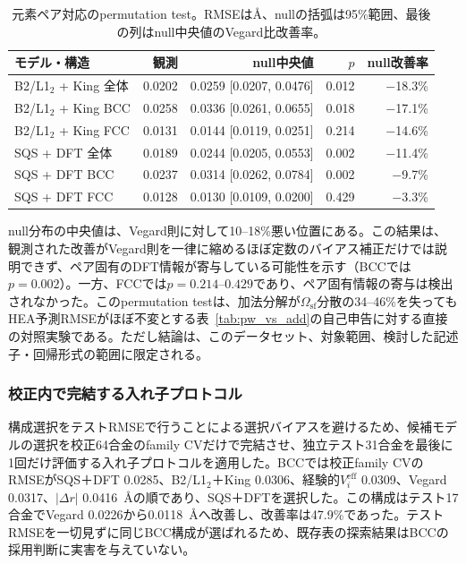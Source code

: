 \documentclass[5p,10pt]{elsarticle}
\begin{document}
\begin{table}[H]
\centering
\caption{元素ペア対応のpermutation test。RMSEは\AA、nullの括弧は95\%範囲、最後の列はnull中央値のVegard比改善率。}
\label{tab:permutation_test}
\scriptsize
\begin{tabular}{@{}lrrrr@{}}
\toprule
モデル・構造 & 観測 & null中央値 & $p$ & null改善率 \\
\midrule
B2/L1$_2$ + King 全体 & 0.0202 & 0.0259 [0.0207, 0.0476] & 0.012 & $-$18.3\% \\
B2/L1$_2$ + King BCC & 0.0258 & 0.0336 [0.0261, 0.0655] & 0.018 & $-$17.1\% \\
B2/L1$_2$ + King FCC & 0.0131 & 0.0144 [0.0119, 0.0251] & 0.214 & $-$14.6\% \\
SQS + DFT 全体 & 0.0189 & 0.0244 [0.0205, 0.0553] & 0.002 & $-$11.4\% \\
SQS + DFT BCC & 0.0237 & 0.0314 [0.0262, 0.0784] & 0.002 & $-$9.7\% \\
SQS + DFT FCC & 0.0128 & 0.0130 [0.0109, 0.0200] & 0.429 & $-$3.3\% \\
\bottomrule
\end{tabular}
\end{table}

null分布の中央値は、Vegard則に対して10--18\%悪い位置にある。この結果は、観測された改善がVegard則を一律に縮めるほぼ定数のバイアス補正だけでは説明できず、ペア固有のDFT情報が寄与している可能性を示す（BCCでは$p = 0.002$）。一方、FCCでは$p=0.214$--$0.429$であり、ペア固有情報の寄与は検出されなかった。このpermutation testは、加法分解が$\Omega_\text{sf}$分散の34--46\%を失ってもHEA予測RMSEがほぼ不変とする表~\ref{tab:pw_vs_add}の自己申告に対する直接の対照実験である。ただし結論は、このデータセット、対象範囲、検討した記述子・回帰形式の範囲に限定される。

\subsubsection{校正内で完結する入れ子プロトコル}
\label{sec:nested_protocol}

構成選択をテストRMSEで行うことによる選択バイアスを避けるため、候補モデルの選択を校正64合金のfamily CVだけで完結させ、独立テスト31合金を最後に1回だけ評価する入れ子プロトコルを適用した。BCCでは校正family CVのRMSEがSQS＋DFT 0.0285、B2/L1$_2$＋King 0.0306、経験的$V_i^\mathrm{eff}$ 0.0309、Vegard 0.0317、$|\Delta r|$ 0.0416~\AA{}の順であり、SQS＋DFTを選択した。この構成はテスト17合金でVegard 0.0226から0.0118~\AA{}へ改善し、改善率は47.9\%であった。テストRMSEを一切見ずに同じBCC構成が選ばれるため、既存表の探索結果はBCCの採用判断に実害を与えていない。
\end{document}
